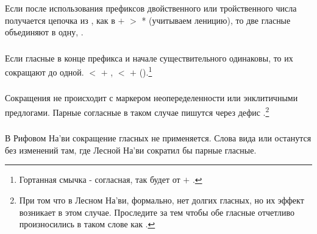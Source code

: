 \subsubsection{} Если после использования префиксов двойственного или тройственного числа получается цепочка из , как в  $+$  $>$ * (учитываем леницию), то две гласные объединяют в одну, .
\label{l-and-s:phonotactics:nsc} 

\subsubsection{} Если гласные в конце префикса и начале существительного одинаковы, то их сокращают до одной.  $<$
 $+$ ,  $<$  $+$ 
().\footnote{Гортанная смычка - согласная, так  будет от  $+$ .}
\label{l-and-s:phonotactics:precontract}

\subsubsection{} Сокращения не происходит с маркером неопеределенности  или энклитичными предлогами. Парные согласные в таком случае пишутся через дефис 
  .\footnote{При том что в Лесном На'ви, формально, нет долгих гласных, но их эффект возникает в этом случае. Проследите за тем чтобы обе гласные  отчетливо произносились в таком слове как .}

\subsubsection{} В Рифовом На'ви сокращение гласных не применяется.
Слова вида  или  останутся без изменений там, где Лесной На'ви сократил бы парные гласные.
\label{rn:no-contract}

